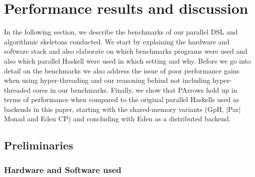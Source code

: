 
%
\section{Performance results and discussion}
\label{sec:benchmarks}

In the following section, we describe the benchmarks of our parallel DSL and algorithmic skeletons conducted.
We start by explaining the hardware and software stack and also elaborate on which benchmarks programs were used
and also which parallel Haskell were used in which setting and why. Before we go into detail on the benchmarks we
also address the issue of poor performance gains when using hyper-threading and our reasoning behind not including
hyper-threaded cores in our benchmarks. Finally, we show that PArrows hold up in terms of performance when compared to the original parallel Haskells used as backends in this paper, starting with the shared-memory variants (GpH, |Par| Monad and Eden CP) and concluding with Eden as a distributed backend.


\newcommand{\rmtest}{Rabin--Miller test\xspace}
\newcommand{\sudokutest}{Sudoku\xspace}
\newcommand{\jacobitest}{Jacobi sum test\xspace}
\newcommand{\torustest}{Gentleman\xspace}
\newlength{\plotwidthSMP}
\setlength{\plotwidthSMP}{0.39\textwidth}
\newlength{\plotwidthDist}
\setlength{\plotwidthDist}{0.6\textwidth}

\newcommand{\benchmarkDir}{benchmarks}

\newcommand{\speedupplot}[8]{
\begin{tikzpicture}
\begin{axis}[title={#1},
title style={align=center},
scale only axis, width=#7,
xlabel=Threads,
xtick distance=#4,
ytick distance=#4,
ylabel=Speedup,
ylabel near ticks,
grid=major,
legend entries={linear, #2},
legend style={at={(0.01,0.99)},anchor=north west},
max space between ticks=50pt,
grid style={line width=.1pt, draw=gray!10},
major grid style={line width=.2pt,draw=gray!50},
ymin=-1,
xmin=-1,
ymax=#8,
xmax=#6]
\addplot [domain=0:#3, no markers,dotted,thick]{x};
#5
\end{axis}
\end{tikzpicture}
}

\subsection{Preliminaries}

\subsubsection{Hardware and Software used}

